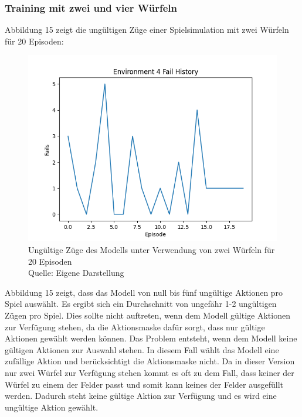 \subsubsection{Training mit zwei und vier Würfeln}
Abbildung 15 zeigt die ungültigen Züge einer Spielsimulation mit zwei Würfeln für 20 Episoden:
\nopagebreak
\begin{figure}[H]
	\includegraphics[width=1\textwidth]{Bilder/failswithtwodice} 
	\caption[Ungültige Züge des Modells unter Verwendung von zwei Würfeln für 20 Episoden]{Ungültige Züge des Modells unter Verwendung von zwei Würfeln für 20 Episoden\\ Quelle: Eigene Darstellung}
\end{figure}

Abbildung 15 zeigt, dass das Modell von null bis fünf ungültige Aktionen pro Spiel auswählt. Es ergibt sich ein Durchschnitt von ungefähr 1-2 ungültigen Zügen pro Spiel. Dies sollte nicht auftreten, wenn dem Modell gültige Aktionen zur Verfügung stehen, da die Aktionsmaske dafür sorgt, dass nur gültige Aktionen gewählt werden können. Das Problem entsteht, wenn dem Modell keine gültigen Aktionen zur Auswahl stehen. In diesem Fall wählt das Modell eine zufällige Aktion und berücksichtigt die Aktionsmaske nicht. Da in dieser Version nur zwei Würfel zur Verfügung stehen kommt es oft zu dem Fall, dass keiner der Würfel zu einem der Felder passt und somit kann keines der Felder ausgefüllt werden. Dadurch steht keine gültige Aktion zur Verfügung und es wird eine ungültige Aktion gewählt.\\

